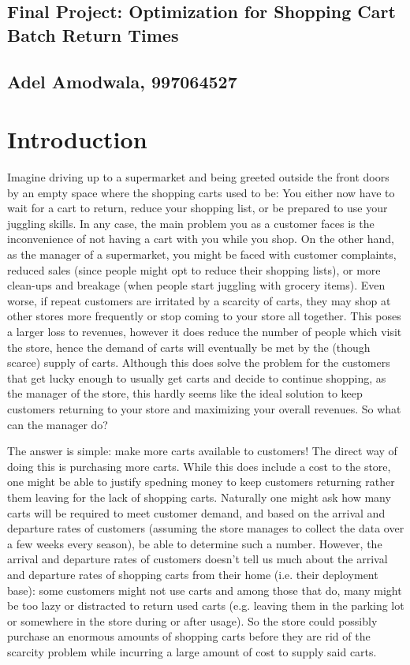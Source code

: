 \documentclass[english]{article}
\begin{document}
\begin{center}
\section*{Final Project: Optimization for Shopping Cart Batch Return Times}
\subsection*{Adel Amodwala, 997064527}
\end{center}

\section*{Introduction}
Imagine driving up to a supermarket and being greeted outside the front doors by an empty space where the shopping carts used to be: You either now have to wait for a cart to return, reduce your shopping list, or be prepared to use your juggling skills. In any case, the main problem you as a customer faces is the inconvenience of not having a cart with you while you shop. On the other hand, as the manager of a supermarket, you might be faced with customer complaints, reduced sales (since people might opt to reduce their shopping lists), or more clean-ups and breakage (when people start juggling with grocery items). Even worse, if repeat customers are irritated by a scarcity of carts, they may shop at other stores more frequently or stop coming to your store all together. This poses a larger loss to revenues, however it does reduce the number of people which visit the store, hence the demand of carts will eventually be met by the (though scarce) supply of carts. Although this does solve the problem for the customers that get lucky enough to usually get carts and decide to continue shopping, as the manager of the store, this hardly seems like the ideal solution to keep customers returning to your store and maximizing your overall revenues. So what can the manager do?

The answer is simple: make more carts available to customers! The direct way of doing this is purchasing more carts. While this does include a cost to the store, one might be able to justify spedning money to keep customers returning rather them leaving for the lack of shopping carts. Naturally one might ask how many carts will be required to meet customer demand, and based on the arrival and departure rates of customers (assuming the store manages to collect the data over a few weeks every season), be able to determine such a number. However, the arrival and departure rates of customers doesn't tell us much about the arrival and departure rates of shopping carts from their home (i.e. their deployment base): some customers might not use carts and among those that do, many might be too lazy or distracted to return used carts (e.g. leaving them in the parking lot or somewhere in the store during or after usage). So the store could possibly purchase an enormous amounts of shopping carts before they are rid of the scarcity problem while incurring a large amount of cost to supply said carts. 
\end{document}
